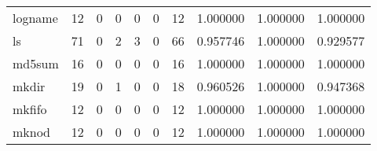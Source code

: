 \begin{tabular}{lrrrrrrrrr}
logname   &                                      12 &                                                  0 &                                                  0 &                                                  0 &                                                  0 &                                                 12 &                                           1.000000 &                               1.000000 &                             1.000000 \\
ls        &                                      71 &                                                  0 &                                                  2 &                                                  3 &                                                  0 &                                                 66 &                                           0.957746 &                               1.000000 &                             0.929577 \\
md5sum    &                                      16 &                                                  0 &                                                  0 &                                                  0 &                                                  0 &                                                 16 &                                           1.000000 &                               1.000000 &                             1.000000 \\
mkdir     &                                      19 &                                                  0 &                                                  1 &                                                  0 &                                                  0 &                                                 18 &                                           0.960526 &                               1.000000 &                             0.947368 \\
mkfifo    &                                      12 &                                                  0 &                                                  0 &                                                  0 &                                                  0 &                                                 12 &                                           1.000000 &                               1.000000 &                             1.000000 \\
mknod     &                                      12 &                                                  0 &                                                  0 &                                                  0 &                                                  0 &                                                 12 &                                           1.000000 &                               1.000000 &                             1.000000 \\

\end{tabular}
